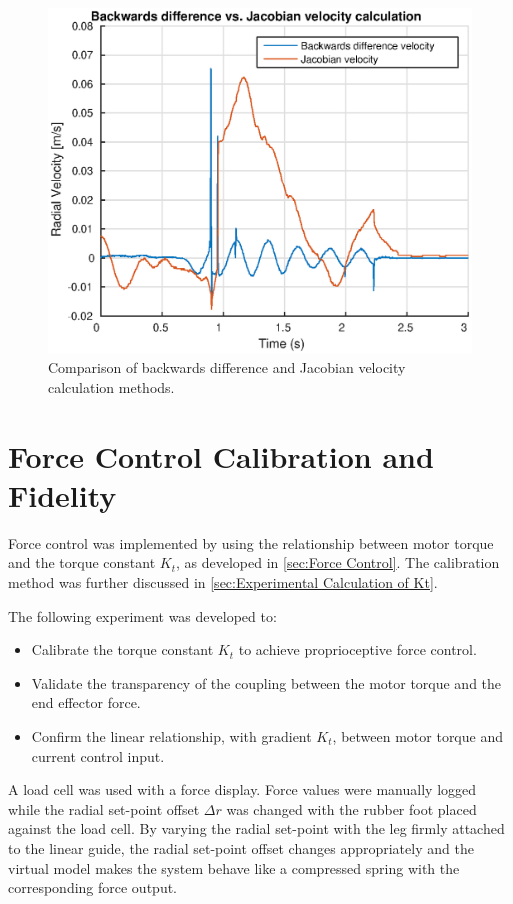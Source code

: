\begin{figure}
\centering
\includegraphics[width=1\textwidth]{images/experiments/velocity-calculation.eps} 
\caption{Comparison of backwards difference and Jacobian velocity calculation methods.}
\label{fig:velocity-calculation}
\end{figure}

\section{Force Control Calibration and Fidelity}
\label{sec:Force Control Calibration and Fidelity}

Force control was implemented by using the relationship between motor torque and the torque constant $K_t$, as developed in \cref{sec:Force Control}. The calibration method was further discussed in \cref{sec:Experimental Calculation of Kt}. 

The following experiment was developed to:
\begin{itemize}
\item Calibrate the torque constant $K_t$ to achieve proprioceptive force control.
\item Validate the transparency of the coupling between the motor torque and the end effector force. 
\item Confirm the linear relationship, with gradient $K_t$, between motor torque and current control input.
\end{itemize}

A load cell was used with a force display. Force values were manually logged while the radial set-point offset $\Delta r$ was changed with the rubber foot placed against the load cell. By varying the radial set-point with the leg firmly attached to the linear guide, the radial set-point offset changes appropriately and the virtual model makes the system behave like a compressed spring with the corresponding force output. 

